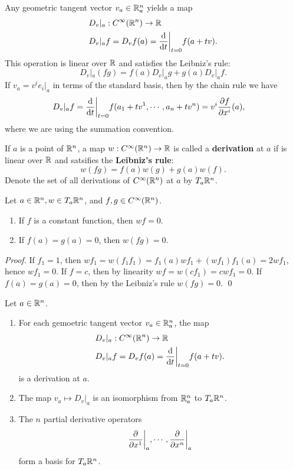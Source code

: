 \begin{example}
    Any geometric tangent vector $v_a \in \mathbb{R}_a^n$ yields a map 
    \begin{align*}
    &D_v|_a: C^\infty(\mathbb{R}^n) \to \mathbb{R} \\
    &D_v|_a f = D_v f(a) = \dv{}{t}\bigg|_{t=0} f(a+tv).
    \end{align*}
    This operation is linear over $\mathbb{R}$ and satisfies the Leibniz's rule:
    $$D_v|_a(fg) = f(a)D_v|_a g + g(a) D_v |_a f. $$
    If $v_a = v^i e_i|_a$ in terms of the standard basis, then by the chain rule we have 
    \begin{align*}
    D_v|_a f &= \dv{}{t}\bigg|_{t=0} f(a_1+t v^1, \cdots, a_n+t v^n) 
    = v^i {\pdv{f}{x^i}}(a), 
    \end{align*}
    where we are using the summation convention.
\end{example}
\begin{definition}
    If $a$ is a point of $\mathbb{R}^n$, a map $w: C^\infty(\mathbb{R}^n) \to \mathbb{R}$ is called a \textbf{derivation} at $a$ if is linear over $\mathbb{R}$ and satsifies the \textbf{Leibniz's rule}:
    $$w(fg) = f(a) w(g) + g(a) w(f). $$
    Denote the set of all derivations of $C^\infty(\mathbb{R}^n)$ at $a$ by $T_a \mathbb{R}^n$.
\end{definition}
\begin{lemma}
    Let $a \in \mathbb{R}^n, w \in T_a \mathbb{R}^n$, and $f,g \in C^\infty(\mathbb{R}^n)$.
    \begin{enumerate}
    \item If $f$ is a constant function, then $wf = 0$.
    \item If $f(a) = g(a) = 0$, then $w(fg) = 0$.
    \end{enumerate}
\end{lemma}
\begin{proof}
    If $f_1=1$, then $wf_1 = w(f_1f_1) = f_1(a)wf_1 + (wf_1)f_1(a) = 2wf_1$, hence $wf_1 = 0$. If $f=c$, then by linearity $wf = w(cf_1) = cwf_1 = 0$. 
    If $f(a) = g(a) = 0$, then by the Leibniz's rule $w(fg) = 0$. \qed 
\end{proof}
\begin{proposition}[$\R_a^n \simeq T_a\R^n$]
    Let $a \in \mathbb{R}^n$.
    \begin{enumerate}
    \item For each gemoetric tangent vector $v_a \in \mathbb{R}_a^n$, the map
    \begin{align*}
    &D_v|_a: C^\infty(\mathbb{R}^n) \to \mathbb{R} \\
    &D_v|_a f = D_v f(a) = \dv{}{t}\bigg|_{t=0} f(a+tv).
    \end{align*}
    is a derivation at $a$. 
    \item The map $v_a \mapsto D_v|_a$ is an isomorphism from $\mathbb{R}_a^n$ to $T_a\mathbb{R}^n$.
    \item The $n$ partial derivative operators 
    $$\pdv{}{x^1}\bigg|_a, \cdots, \pdv{}{x^n}\bigg|_a$$
    form a basis for $T_a \mathbb{R}^n$. 
    \end{enumerate}
\end{proposition}
